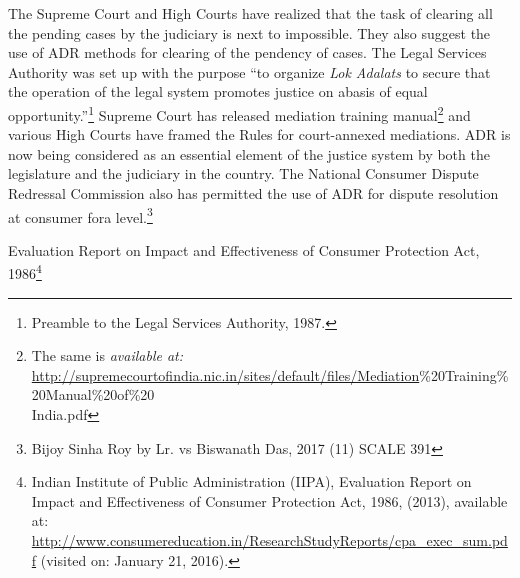 \begin{multicols}{2}

\noi
The Supreme Court and High Courts have realized that the task of clearing all the pending cases
by the judiciary is next to impossible. They also suggest the use of ADR methods for clearing
of the pendency of cases. The Legal Services Authority was set up with the purpose “to
organize \textit{Lok Adalats} to secure that the operation of the legal system promotes justice on abasis
of equal opportunity.”\footnote{Preamble to the Legal Services Authority, 1987.} Supreme Court has released mediation training manual\footnote{The same is \textit{available at:}\\ \url{http://supremecourtofindia.nic.in/sites/default/files/Mediation}\%20Training\%20Manual\%20of\%20\\India.pdf} and various High Courts have framed the Rules for court-annexed mediations. ADR is now being considered as an essential element of the justice system by both the legislature and the judiciary in the country. The National Consumer Dispute Redressal Commission also has permitted the use of ADR for dispute resolution at consumer fora level.\footnote{Bijoy Sinha Roy by Lr. vs Biswanath Das, 2017 (11) SCALE 391}

\vspace{-.2cm}


\vspace{-.2cm}

\noi
Evaluation Report on Impact and Effectiveness of Consumer Protection Act, 1986\footnote{Indian Institute of Public Administration (IIPA), Evaluation Report on Impact and Effectiveness of Consumer  Protection Act, 1986, (2013), available at: \url{http://www.consumereducation.in/ResearchStudyReports/cpa_exec_sum.pdf} (visited on: January 21, 2016).}


\end{multicols}
